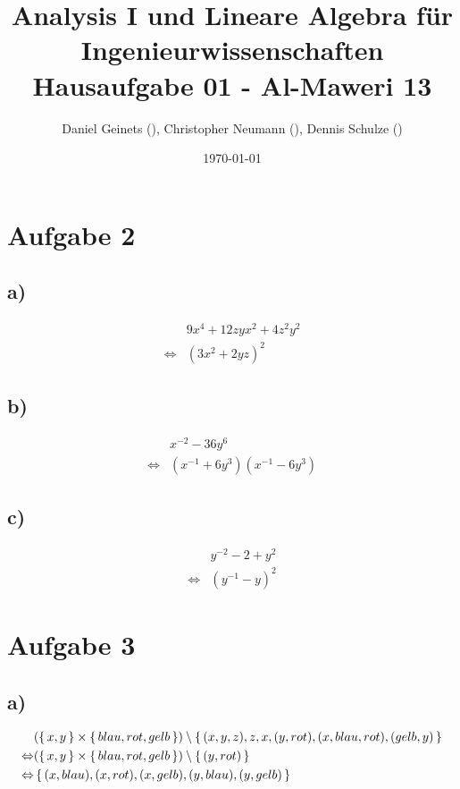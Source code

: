 \documentclass[a4paper, 11pt]{article}
\author{Daniel Geinets (), Christopher Neumann (), Dennis Schulze ()}
\date{\today}
\title{Analysis I und Lineare Algebra für Ingenieurwissenschaften \large  \\ Hausaufgabe 01 - Al-Maweri 13}
\begin{document}
\maketitle
\tableofcontents

\setcounter{secnumdepth}{0}

\pagebreak

\section{Aufgabe 2}
\label{sec:orgd802e2e}
\subsection{a)}
\label{sec:org78630fa}
\begin{align*}
    & 9x^4 + 12zyx^2 + 4z^2y^2 \\
    \Leftrightarrow & (3x^2 + 2yz)^2
\end{align*}

\subsection{b)}
\label{sec:orga7b34b0}
\begin{align*}
    & x^{-2} - 36y^6 \\
    \Leftrightarrow & (x^{-1} + 6y^3)(x^{-1} - 6y^3)
\end{align*}

\subsection{c)}
\label{sec:org48d3a9d}
\begin{align*}
    & y^{-2} - 2 + y^2 \\
    \Leftrightarrow & (y^{-1} - y)^2
\end{align*}

\section{Aufgabe 3}
\label{sec:orgfdb89d7}
\subsection{a)}
\label{sec:orgc11eb5f}
\begin{align*}
    & ( \set{x, y}  \times \set{blau, rot, gelb}) \setminus \set{(x, y, z), z, x, (y, rot), (x, blau, rot), (gelb, y)} \\
    \Leftrightarrow & (\set{x, y} \times \set{blau, rot, gelb}) \setminus \set{(y, rot)} \\
    \Leftrightarrow & \set{(x, blau), (x, rot), (x, gelb), (y, blau), (y, gelb)}
\end{align*}
\end{document}
